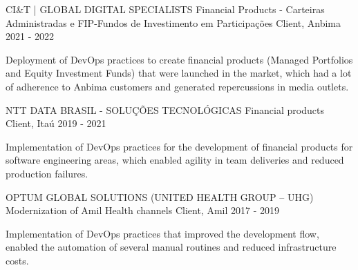 

\begin{cventries}

  \cventry
    {CI\&T | GLOBAL DIGITAL SPECIALISTS} %
    {Financial Products - Carteiras Administradas e FIP-Fundos de Investimento em Participações} %
    {Client, Anbima} %
    {2021 - 2022} %
    {
      \begin{cvitems} %
        \item {Deployment of DevOps practices to create financial products (Managed Portfolios and Equity Investment Funds) that were launched in the market, which had a lot of adherence to Anbima customers and generated repercussions in media outlets.}
      \end{cvitems}
    }

  \cventry
    {NTT DATA BRASIL - SOLUÇÕES TECNOLÓGICAS} %
    {Financial products} %
    {Client, Itaú} %
    {2019 - 2021} %
    {
      \begin{cvitems} %
        \item {Implementation of DevOps practices for the development of financial products for software engineering areas, which enabled agility in team deliveries and reduced production failures.}
      \end{cvitems}
    }

  \cventry
    {OPTUM GLOBAL SOLUTIONS (UNITED HEALTH GROUP – UHG)} %
    {Modernization of Amil Health channels} %
    {Client, Amil} %
    {2017 - 2019} %
    {
      \begin{cvitems} %
        \item {Implementation of DevOps practices that improved the development flow, enabled the automation of several manual routines and reduced infrastructure costs.}
      \end{cvitems}
}

\end{cventries}
